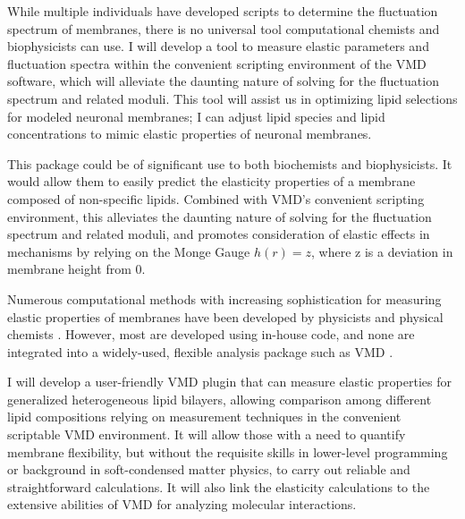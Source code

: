 While multiple individuals have developed scripts to determine the fluctuation spectrum of membranes, there is no universal tool computational chemists and biophysicists can use. I will develop a tool to measure elastic parameters and fluctuation spectra within the convenient scripting environment of the VMD software, which will alleviate the daunting nature of solving for the fluctuation spectrum and related moduli.  This tool will assist us in optimizing lipid selections for modeled neuronal membranes; I can adjust lipid species and lipid concentrations to mimic elastic properties of neuronal membranes.

This package could be of significant use to both biochemists and biophysicists. It would allow them to easily predict the elasticity properties of a membrane composed of non-specific lipids. Combined with VMD’s convenient scripting environment, this alleviates the daunting nature of solving for the fluctuation spectrum and related moduli, and promotes consideration of elastic effects in mechanisms by relying on the Monge Gauge $h(r)=z$, where z is a deviation in membrane height from 0.  


Numerous computational methods with increasing sophistication for measuring elastic properties of membranes have been developed by physicists and physical chemists \cite{Galimzyanov_Undulations_2017,Brannigan2006,Pan_Effect_2009,Rawicz_Effect_2000,Goetz1999}. However, most are developed using in-house code, and none are integrated into a widely-used, flexible analysis package such as VMD \cite{HUMP96}.

I will develop a user-friendly VMD plugin that can measure elastic properties for generalized heterogeneous lipid bilayers, allowing comparison among different lipid compositions relying on measurement techniques in the convenient scriptable VMD environment. It will allow those with a need to quantify membrane flexibility, but without the requisite skills in lower-level programming or background in soft-condensed matter physics, to carry out reliable and straightforward calculations. It will also link the elasticity calculations to the extensive abilities of VMD for analyzing molecular interactions.


